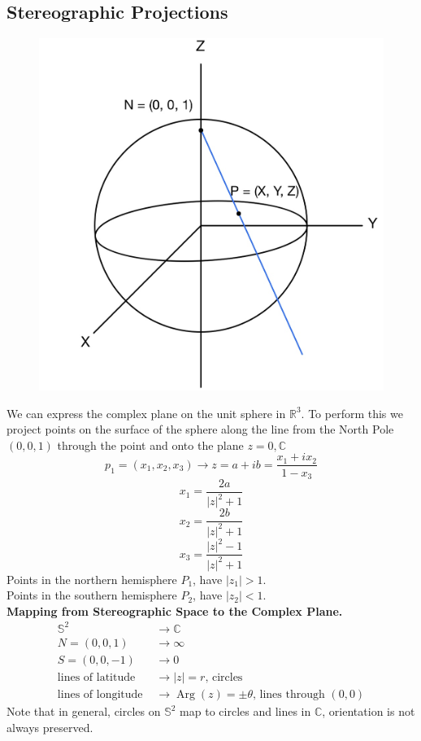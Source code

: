\documentclass[11pt]{article}
\begin{document}
\subsection{Stereographic Projections} 
\begin{figure}[H]
\includegraphics[scale = 0.19]{3_1}
\centering
\end{figure}
We can express the complex plane on the unit sphere in $\mathbb{R}^3$. To perform this we project points on the surface of the sphere along the line from the North Pole $(0, 0, 1)$ through the point and onto the plane $z = 0, \mathbb{C}$ \\ 
$$p_1 = (x_1, x_2, x_3) \to z = a + ib = \frac{x_1 + ix_2}{1 - x_3}$$
$$x_1 = \frac{2a}{|z|^2 + 1}$$
$$x_2 = \frac{2b}{|z|^2 + 1}$$
$$x_3 = \frac{|z|^2 - 1}{|z|^2 + 1}$$
Points in the northern hemisphere $P_1$, have $|z_1| > 1$. \\
Points in the southern hemisphere $P_2$, have $|z_2| < 1$. \\
\newline
\textbf{Mapping from Stereographic Space to the Complex Plane.} 
\begin{align*}
\mathbb{S}^2 &\to \mathbb{C}\\
N = (0, 0, 1) &\to \infty \\
S = (0, 0, -1) &\to 0 \\
\mbox{lines of latitude } &\to |z| = r \mbox{, circles} \\
\mbox{lines of longitude } &\to \operatorname{Arg}(z) = \pm\theta \mbox{, lines through } (0, 0) 
\end{align*}
Note that in general, circles on $\mathbb{S}^2$ map to circles and lines in $\mathbb{C}$, orientation is not always preserved. 
\end{document}
